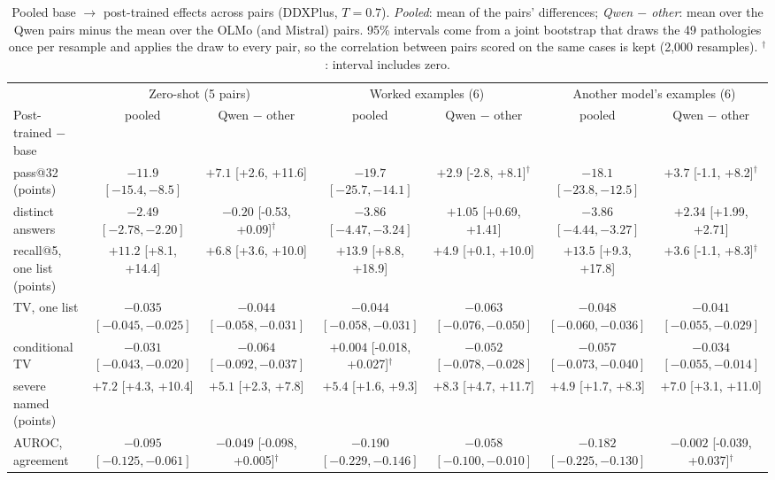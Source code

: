 \documentclass[11pt]{article}
\begin{document}
\begin{table}[t]
\centering\small
\begin{adjustbox}{max width=\linewidth}
\begin{tabular}{lcccccc}
\toprule
 & \multicolumn{2}{c}{Zero-shot (5 pairs)} & \multicolumn{2}{c}{Worked examples (6)} & \multicolumn{2}{c}{Another model's examples (6)} \\
Post-trained $-$ base & pooled & Qwen $-$ other & pooled & Qwen $-$ other & pooled & Qwen $-$ other \\
\midrule
pass@32 (points) & $-11.9$ $[-15.4,-8.5]$ & $+7.1$ [+2.6, +11.6] & $-19.7$ $[-25.7,-14.1]$ & $+2.9$ [-2.8, +8.1]$^{\dagger}$ & $-18.1$ $[-23.8,-12.5]$ & $+3.7$ [-1.1, +8.2]$^{\dagger}$ \\
distinct answers & $-2.49$ $[-2.78,-2.20]$ & $-0.20$ [-0.53, +0.09]$^{\dagger}$ & $-3.86$ $[-4.47,-3.24]$ & $+1.05$ [+0.69, +1.41] & $-3.86$ $[-4.44,-3.27]$ & $+2.34$ [+1.99, +2.71] \\
recall@5, one list (points) & $+11.2$ [+8.1, +14.4] & $+6.8$ [+3.6, +10.0] & $+13.9$ [+8.8, +18.9] & $+4.9$ [+0.1, +10.0] & $+13.5$ [+9.3, +17.8] & $+3.6$ [-1.1, +8.3]$^{\dagger}$ \\
TV, one list & $-0.035$ $[-0.045,-0.025]$ & $-0.044$ $[-0.058,-0.031]$ & $-0.044$ $[-0.058,-0.031]$ & $-0.063$ $[-0.076,-0.050]$ & $-0.048$ $[-0.060,-0.036]$ & $-0.041$ $[-0.055,-0.029]$ \\
conditional TV & $-0.031$ $[-0.043,-0.020]$ & $-0.064$ $[-0.092,-0.037]$ & $+0.004$ [-0.018, +0.027]$^{\dagger}$ & $-0.052$ $[-0.078,-0.028]$ & $-0.057$ $[-0.073,-0.040]$ & $-0.034$ $[-0.055,-0.014]$ \\
severe named (points) & $+7.2$ [+4.3, +10.4] & $+5.1$ [+2.3, +7.8] & $+5.4$ [+1.6, +9.3] & $+8.3$ [+4.7, +11.7] & $+4.9$ [+1.7, +8.3] & $+7.0$ [+3.1, +11.0] \\
AUROC, agreement & $-0.095$ $[-0.125,-0.061]$ & $-0.049$ [-0.098, +0.005]$^{\dagger}$ & $-0.190$ $[-0.229,-0.146]$ & $-0.058$ $[-0.100,-0.010]$ & $-0.182$ $[-0.225,-0.130]$ & $-0.002$ [-0.039, +0.037]$^{\dagger}$ \\
\bottomrule
\end{tabular}
\end{adjustbox}
\caption{Pooled base $\rightarrow$ post-trained effects across pairs (DDXPlus, $T{=}0.7$). \emph{Pooled}: mean of the pairs' differences; \emph{Qwen $-$ other}: mean over the Qwen pairs minus the mean over the OLMo (and Mistral) pairs. 95\% intervals come from a joint bootstrap that draws the 49 pathologies once per resample and applies the draw to every pair, so the correlation between pairs scored on the same cases is kept (2,000 resamples). $^{\dagger}$: interval includes zero.}
\label{tab:meta}
\end{table}
\end{document}
